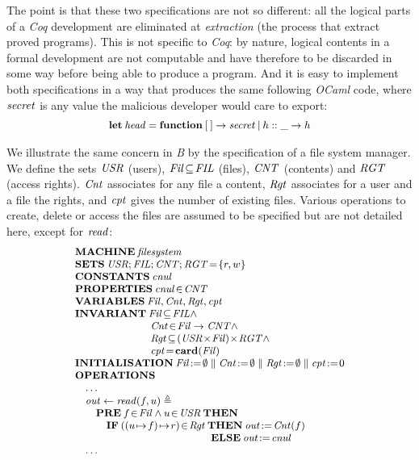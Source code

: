 \documentclass[conference]{IEEEtran}
\begin{document}
The point is that these two specifications are not so different: all the logical parts of a
\emph{Coq} development are eliminated at \emph{extraction} (the process that extract proved
programs). This is not specific to \emph{Coq}: by nature, logical contents in a formal
development are not computable and have therefore to be discarded in some way before being
able to produce a program. And it is easy to implement both specifications in a way that
produces the same following \emph{OCaml} code, where {\small$\textrm{\emph{secret}}$} is any value the
malicious developer would care to export:
\[\small\begin{array}{l}
\mathbf{let}\:\textrm{\emph{head}}=\mathbf{function}\:[\:]\to\textrm{\emph{secret}}\:|\:h::\_\to h
\end{array}\]

We illustrate the same concern in \emph{B} by the specification of a file system manager. We
define the sets {\small$\textrm{\emph{USR}}$} (users), {\small$\textrm{\emph{Fil}}\!\subseteq\!\textrm{\emph{FIL}}$}
(files), {\small$\textrm{\emph{CNT}}$} (contents) and {\small$\textrm{\emph{RGT}}$} (access rights).
{\small$\textrm{\emph{Cnt}}$} associates for any file a content, {\small$\textrm{\emph{Rgt}}$} associates for a
user and a file the rights, and {\small$\textrm{\emph{cpt}}$} gives the number of existing files.
Various operations to create, delete or access the files are assumed to be specified but are
not detailed here, except for {\small$\textrm{\emph{read}}$}:
\[\small\begin{array}{l}
\Cmd{MACHINE}\:\fid{filesystem}\\
\Cmd{SETS}\:\fid{USR};\fid{FIL};\fid{CNT};\fid{RGT}\!=\!\{r,w\}\\
\Cmd{CONSTANTS}\:\fid{cnul}\\
\Cmd{PROPERTIES}\:\fid{cnul}\!\in\!\fid{CNT}\\
\Cmd{VARIABLES}\:\fid{Fil},\fid{Cnt},\fid{Rgt},\fid{cpt}\\
\Cmd{INVARIANT}\:\fid{Fil}\!\subseteq\!\fid{FIL}\land\\
\quad\quad\quad\quad\quad\quad\quad\:
\fid{Cnt}\!\in\!\fid{Fil}\to\fid{CNT}\land\\
\quad\quad\quad\quad\quad\quad\quad\:
\fid{Rgt}\!\subseteq\!(\fid{USR}\!\times\!\fid{Fil})\!\times\!\fid{RGT}\land\\
\quad\quad\quad\quad\quad\quad\quad\:
\fid{cpt}\!=\!\Cmd{card}(\fid{Fil})\\
\Cmd{INITIALISATION}\:\fid{Fil}\!:=\!\emptyset\parallel \fid{Cnt}\!:=\!\emptyset\parallel
                      \fid{Rgt}\!:=\!\emptyset\parallel \fid{cpt}\!:=\!0\\
\Cmd{OPERATIONS}\\
\quad\ldots\\
\quad \fid{out}\gets \fid{read}(f,u)\triangleq\\
\quad\quad\Cmd{PRE}\:f\!\in\!\fid{Fil}\land u\!\in\!\fid{USR}\:\Cmd{THEN}\\
\quad\quad\quad\Cmd{IF}\:((u\!\mapsto\!f)\!\mapsto\!r)\!\in\!\fid{Rgt}\:\Cmd{THEN}\:
 \fid{out}\!:=\!\fid{Cnt}(f)\\
\quad\quad\quad\quad\quad\quad\quad\quad\quad\quad\quad\quad\quad
\Cmd{ELSE}\:\fid{out}\!:=\!\fid{cnul}\\
\quad\ldots\\
\end{array}\]
\end{document}
